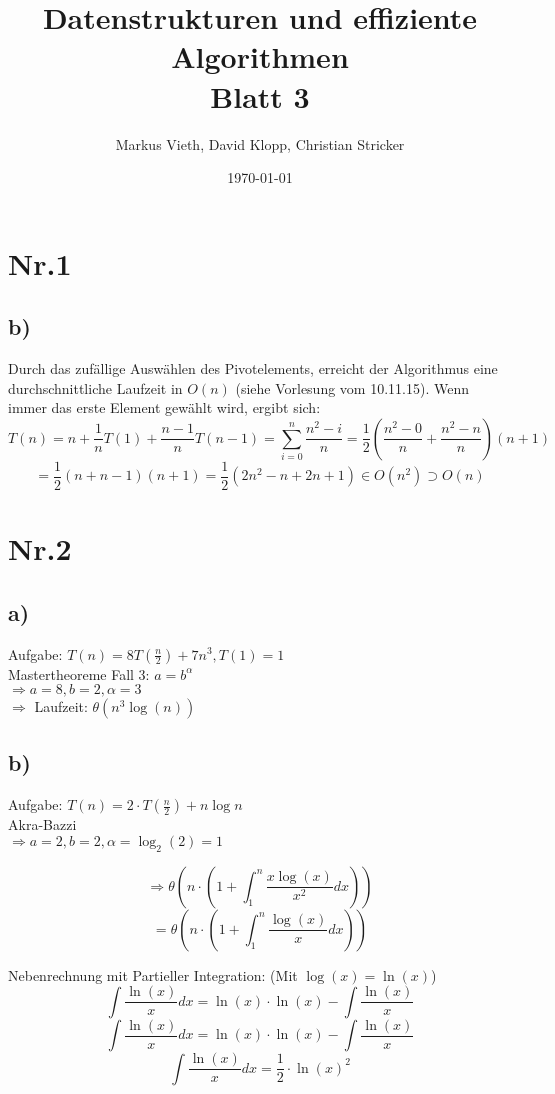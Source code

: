 \documentclass[a4paper,11pt,twoside]{article}
\title{Datenstrukturen und effiziente Algorithmen\\ Blatt 3}
\author{Markus Vieth, David Klopp, Christian Stricker}
\date{\today}
\begin{document}
\maketitle
\cleardoublepage
\pagestyle{myheadings}

\section*{Nr.1}
\subsection*{b)}

Durch das zufällige Auswählen des Pivotelements, erreicht der Algorithmus eine durchschnittliche Laufzeit in $O(n)$ (siehe Vorlesung vom 10.11.15). 
Wenn immer das erste Element gewählt wird, ergibt sich:
\[T(n)=n+\frac{1}{n}T(1)+\frac{n-1}{n}T(n-1)=\sum_{i=0}^{n}\frac{n^2-i}{n}=\frac{1}{2}\left(\frac{n^2-0}{n}+\frac{n^2-n}{n}\right)(n+1)\]
\[=\frac{1}{2}(n+n-1)(n+1)=\frac{1}{2}(2n^2-n+2n+1)\in O(n^2)\supset O(n)\]

\section*{Nr.2}
\subsection*{a)}
Aufgabe: $T(n) = 8T(\frac{n}{2})+7n^3, T(1)=1 $ \\

Mastertheoreme Fall 3: $a = b^{\alpha}$ \\
$\Rightarrow a=8, b=2, \alpha=3 $ \\
$\Rightarrow$ Laufzeit:  $\theta (n^3\log(n))$


\subsection*{b)}
Aufgabe: $ T(n)=2 \cdot T(\frac{n}{2})+n\log n $ \\

Akra-Bazzi \\
$\Rightarrow a=2, b=2, \alpha=\log_2(2) =1 $ 

\[ \Rightarrow \theta(n \cdot (1+\int_1^n \frac{x\log(x)}{x^2} dx )) \]
\[= \theta(n \cdot (1+\int_1^n \frac{\log(x)}{x} dx )) \] 

Nebenrechnung mit Partieller Integration: (Mit $\log(x) = \ln(x)$) \\
\[ \int \frac{\ln(x)}{x} dx = \ln(x) \cdot \ln(x) - \int \frac{\ln(x)}{x} \]
\[ \int \frac{\ln(x)}{x} dx = \ln(x) \cdot \ln(x) - \int \frac{\ln(x)}{x} \]
\[ \int \frac{\ln(x)}{x} dx = \frac{1}{2} \cdot \ln(x)^2 \] \\
\end{document}
